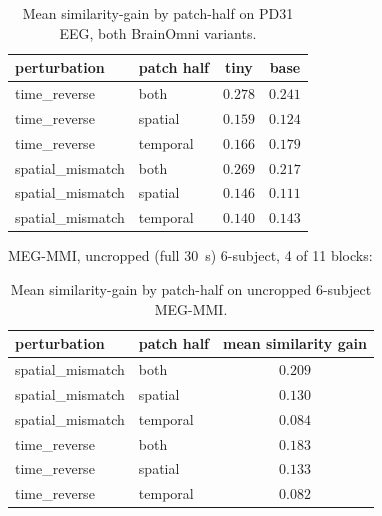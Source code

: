 \documentclass[11pt]{article}
\begin{document}
\begin{table}[h]
\centering
\small
\begin{tabular}{llcc}
\toprule
\textbf{perturbation} & \textbf{patch half} & \textbf{tiny} & \textbf{base} \\
\midrule
time\_reverse      & both     & $0.278$ & $0.241$ \\
time\_reverse      & spatial  & $0.159$ & $0.124$ \\
time\_reverse      & temporal & $0.166$ & $0.179$ \\
spatial\_mismatch  & both     & $0.269$ & $0.217$ \\
spatial\_mismatch  & spatial  & $0.146$ & $0.111$ \\
spatial\_mismatch  & temporal & $0.140$ & $0.143$ \\
\bottomrule
\end{tabular}
\caption{Mean similarity-gain by patch-half on PD31 EEG, both BrainOmni
variants.\label{tab:st-pd31}}
\end{table}

MEG-MMI, uncropped (full 30~s) 6-subject, 4 of 11 blocks:

\begin{table}[h]
\centering
\small
\begin{tabular}{llc}
\toprule
\textbf{perturbation} & \textbf{patch half} & \textbf{mean similarity gain} \\
\midrule
spatial\_mismatch  & both     & $0.209$ \\
spatial\_mismatch  & spatial  & $0.130$ \\
spatial\_mismatch  & temporal & $0.084$ \\
time\_reverse      & both     & $0.183$ \\
time\_reverse      & spatial  & $0.133$ \\
time\_reverse      & temporal & $0.082$ \\
\bottomrule
\end{tabular}
\caption{Mean similarity-gain by patch-half on uncropped 6-subject MEG-MMI.
\label{tab:st-meg}}
\end{table}
\end{document}
